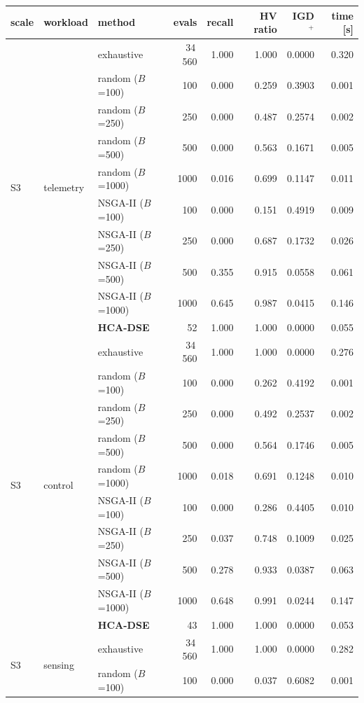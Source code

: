 \scriptsize
\begin{tabular}{lllrrrrr}
\toprule
scale & workload & method & evals & recall & HV ratio & IGD$^{+}$ & time [s] \\
\midrule
\multirow{10}{*}{S3} & \multirow{10}{*}{telemetry} & exhaustive & 34\,560 & 1.000 & 1.000 & 0.0000 & 0.320 \\
 & & random ($B$=100) & 100 & 0.000 & 0.259 & 0.3903 & 0.001 \\
 & & random ($B$=250) & 250 & 0.000 & 0.487 & 0.2574 & 0.002 \\
 & & random ($B$=500) & 500 & 0.000 & 0.563 & 0.1671 & 0.005 \\
 & & random ($B$=1000) & 1000 & 0.016 & 0.699 & 0.1147 & 0.011 \\
 & & NSGA-II ($B$=100) & 100 & 0.000 & 0.151 & 0.4919 & 0.009 \\
 & & NSGA-II ($B$=250) & 250 & 0.000 & 0.687 & 0.1732 & 0.026 \\
 & & NSGA-II ($B$=500) & 500 & 0.355 & 0.915 & 0.0558 & 0.061 \\
 & & NSGA-II ($B$=1000) & 1000 & 0.645 & 0.987 & 0.0415 & 0.146 \\
 & & \textbf{HCA-DSE} & 52 & 1.000 & 1.000 & 0.0000 & 0.055 \\
\midrule
\multirow{10}{*}{S3} & \multirow{10}{*}{control} & exhaustive & 34\,560 & 1.000 & 1.000 & 0.0000 & 0.276 \\
 & & random ($B$=100) & 100 & 0.000 & 0.262 & 0.4192 & 0.001 \\
 & & random ($B$=250) & 250 & 0.000 & 0.492 & 0.2537 & 0.002 \\
 & & random ($B$=500) & 500 & 0.000 & 0.564 & 0.1746 & 0.005 \\
 & & random ($B$=1000) & 1000 & 0.018 & 0.691 & 0.1248 & 0.010 \\
 & & NSGA-II ($B$=100) & 100 & 0.000 & 0.286 & 0.4405 & 0.010 \\
 & & NSGA-II ($B$=250) & 250 & 0.037 & 0.748 & 0.1009 & 0.025 \\
 & & NSGA-II ($B$=500) & 500 & 0.278 & 0.933 & 0.0387 & 0.063 \\
 & & NSGA-II ($B$=1000) & 1000 & 0.648 & 0.991 & 0.0244 & 0.147 \\
 & & \textbf{HCA-DSE} & 43 & 1.000 & 1.000 & 0.0000 & 0.053 \\
\midrule
\multirow{10}{*}{S3} & \multirow{10}{*}{sensing} & exhaustive & 34\,560 & 1.000 & 1.000 & 0.0000 & 0.282 \\
 & & random ($B$=100) & 100 & 0.000 & 0.037 & 0.6082 & 0.001 \\

\end{tabular}
